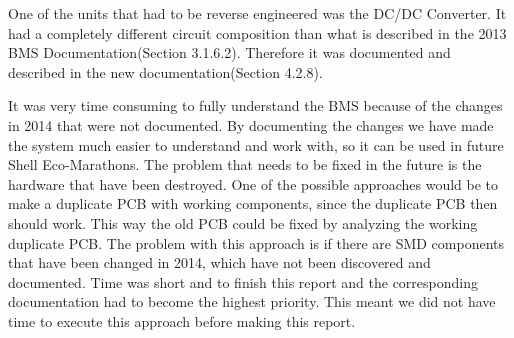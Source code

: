 One of the units that had to be reverse engineered was the DC/DC Converter. It had a completely different circuit composition than what is described in the 2013 BMS Documentation\cite{BMSDocumentation}(Section 3.1.6.2). Therefore it was documented and described in the new documentation\cite{AU2}(Section 4.2.8). 

It was very time consuming to fully understand the BMS because of the changes in 2014 that were not documented. By documenting the changes we have made the system much easier to understand and work with, so it can be used in future Shell Eco-Marathons. The problem that needs to be fixed in the future is the hardware that have been destroyed. One of the possible approaches would be to make a duplicate PCB with working components, since the duplicate PCB then should work. This way the old PCB could be fixed by analyzing the working duplicate PCB. The problem with this approach is if there are SMD components that have been changed in 2014, which have not been discovered and documented. Time was short and to finish this report and the corresponding documentation had to become the highest priority. This meant we did not have time to execute this approach before making this report.